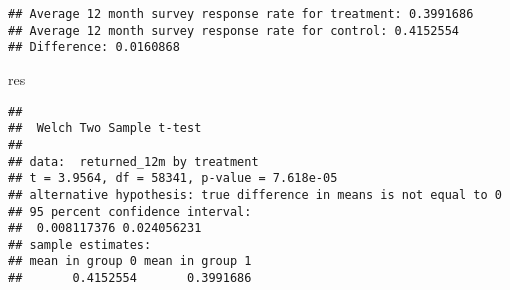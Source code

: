 \documentclass[
]{article}
\newenvironment{Shaded}{\begin{snugshade}}{\end{snugshade}}
\newcommand{\CharTok}[1]{\textcolor[rgb]{0.31,0.60,0.02}{#1}}
\newcommand{\CommentTok}[1]{\textcolor[rgb]{0.56,0.35,0.01}{\textit{#1}}}
\newcommand{\DataTypeTok}[1]{\textcolor[rgb]{0.13,0.29,0.53}{#1}}
\newcommand{\DecValTok}[1]{\textcolor[rgb]{0.00,0.00,0.81}{#1}}
\newcommand{\KeywordTok}[1]{\textcolor[rgb]{0.13,0.29,0.53}{\textbf{#1}}}
\newcommand{\NormalTok}[1]{#1}
\newcommand{\OperatorTok}[1]{\textcolor[rgb]{0.81,0.36,0.00}{\textbf{#1}}}
\newcommand{\StringTok}[1]{\textcolor[rgb]{0.31,0.60,0.02}{#1}}
\begin{document}
\begin{Shaded}
\end{Shaded}

\begin{verbatim}
## Average 12 month survey response rate for treatment: 0.3991686 
## Average 12 month survey response rate for control: 0.4152554 
## Difference: 0.0160868
\end{verbatim}

\begin{Shaded}
\begin{Highlighting}[]
\NormalTok{res}
\end{Highlighting}
\end{Shaded}

\begin{verbatim}
## 
##  Welch Two Sample t-test
## 
## data:  returned_12m by treatment
## t = 3.9564, df = 58341, p-value = 7.618e-05
## alternative hypothesis: true difference in means is not equal to 0
## 95 percent confidence interval:
##  0.008117376 0.024056231
## sample estimates:
## mean in group 0 mean in group 1 
##       0.4152554       0.3991686
\end{verbatim}
\end{document}
